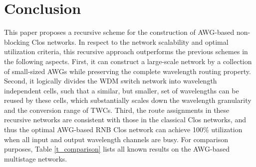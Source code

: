 \documentclass[journal]{IEEEtran}
\begin{document}
\section{Conclusion}\label{conclusion}
This paper proposes a recursive scheme for the construction of
AWG-based non-blocking Clos networks. In respect to the network
scalability and optimal utilization criteria, this recursive
approach outperforms the previous schemes in the following aspects.
First, it can construct a large-scale network by a collection of
small-sized AWGs while preserving the complete wavelength routing
property. Second, it logically divides the WDM switch network into
wavelength independent cells, such that a similar, but smaller, set
of wavelengths can be reused by these cells, which substantially
scales down the wavelength granularity and the conversion range of
TWCs. Third, the route assignments in these recursive networks are
consistent with those in the classical Clos networks, and thus the
optimal AWG-based RNB Clos network can achieve 100\% utilization
when all input and output wavelength channels are busy. For
comparison purposes, Table \ref{t_comparison} lists all known
results on the AWG-based multistage networks.


\end{document}
